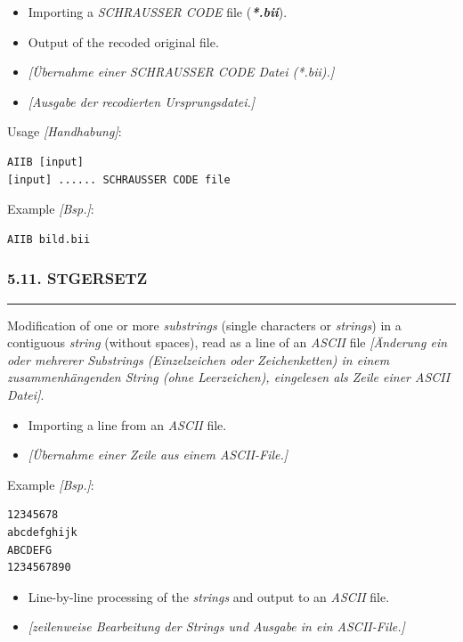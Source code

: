 \documentclass[
]{article}
\providecommand{\tightlist}{%
  \setlength{\itemsep}{0pt}\setlength{\parskip}{0pt}}
\begin{document}
\begin{itemize}
\item
  Importing a \emph{SCHRAUSSER CODE} file (\textbf{\emph{*.bii}}).
\item
  Output of the recoded original file.
\item
  \emph{{[}Übernahme einer SCHRAUSSER CODE Datei (*.bii).{]}}
\item
  \emph{{[}Ausgabe der recodierten Ursprungsdatei.{]}}
\end{itemize}

Usage \emph{{[}Handhabung{]}}:

\begin{verbatim}
AIIB [input]
[input] ...... SCHRAUSSER CODE file
\end{verbatim}

Example \emph{{[}Bsp.{]}}:

\begin{verbatim}
AIIB bild.bii
\end{verbatim}

\hypertarget{stgersetz}{%
\subsubsection{5.11. STGERSETZ}\label{stgersetz}}

\begin{center}\rule{0.5\linewidth}{0.5pt}\end{center}

Modification of one or more \emph{substrings} (single characters or
\emph{strings}) in a contiguous \emph{string} (without spaces), read as
a line of an \emph{ASCII} file \emph{{[}Änderung ein oder mehrerer
Substrings (Einzelzeichen oder Zeichenketten) in einem zusammenhängenden
String (ohne Leerzeichen), eingelesen als Zeile einer ASCII Datei{]}}.

\begin{itemize}
\tightlist
\item
  Importing a line from an \emph{ASCII} file.
\item
  \emph{{[}Übernahme einer Zeile aus einem ASCII-File.{]}}
\end{itemize}

Example \emph{{[}Bsp.{]}}:

\begin{verbatim}
12345678
abcdefghijk
ABCDEFG
1234567890
\end{verbatim}

\begin{itemize}
\tightlist
\item
  Line-by-line processing of the \emph{strings} and output to an
  \emph{ASCII} file.
\item
  \emph{{[}zeilenweise Bearbeitung der Strings und Ausgabe in ein
  ASCII-File.{]}}
\end{itemize}
\end{document}
